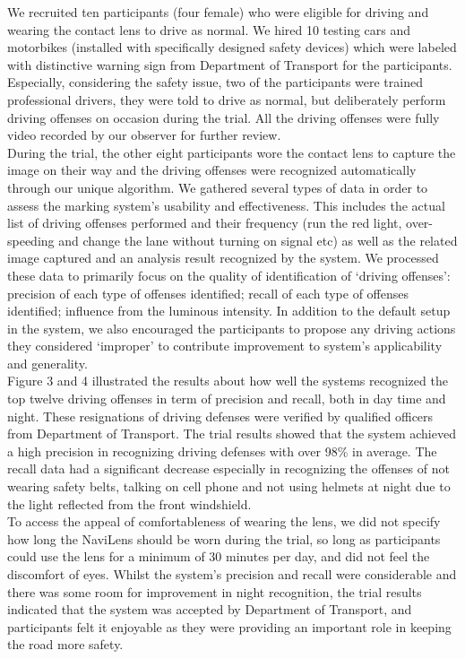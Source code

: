 \documentclass{chi-ext}
\begin{document}
\begin{multicols}{2}
We recruited ten participants (four female) who were eligible for driving and wearing the contact lens to drive as normal. We hired 10 testing cars and motorbikes (installed with specifically designed safety devices) which were labeled with distinctive warning sign from Department of Transport for the participants. Especially, considering the safety issue, two of the participants were trained professional drivers, they were told to drive as normal, but deliberately perform driving offenses on occasion during the trial. All the driving offenses were fully video recorded by our observer for further review.\\

During the trial, the other eight participants wore the contact lens to capture the image on their way and the driving offenses were recognized automatically through our unique algorithm. We gathered several types of data in order to assess the marking system's usability and effectiveness. This includes the actual list of driving offenses performed and their frequency (run the red light, over-speeding and change the lane without turning on signal etc) as well as the related image captured and an analysis result recognized by the system. We processed these data to primarily focus on the quality of identification of ‘driving offenses’: precision of each type of offenses identified; recall of each type of offenses identified; influence from the luminous intensity. In addition to the default setup in the system, we also encouraged the participants to propose any driving actions they considered ‘improper’ to contribute improvement to system's applicability and generality.\\

Figure 3 and 4 illustrated the results about how well the systems recognized the top twelve driving offenses in term of precision and recall, both in day time and night. These resignations of driving defenses were verified by qualified officers from Department of Transport. The trial results showed that the system achieved a high precision in recognizing driving defenses with over 98\% in average. The recall data had a significant decrease especially in recognizing the offenses of not wearing safety belts, talking on cell phone and not using helmets at night due to the light reflected from the front windshield.\\

To access the appeal of comfortableness of wearing the lens, we did not specify how long the NaviLens should be worn during the trial, so long as participants could use the lens for a minimum of 30 minutes per day, and did not feel the discomfort of eyes. Whilst the system's precision and recall were considerable and there was some room for improvement in night recognition, the trial results indicated that the system was accepted by Department of Transport, and participants felt it enjoyable as they were providing an important role in keeping the road more safety.\\



\end{multicols}
\end{document}
